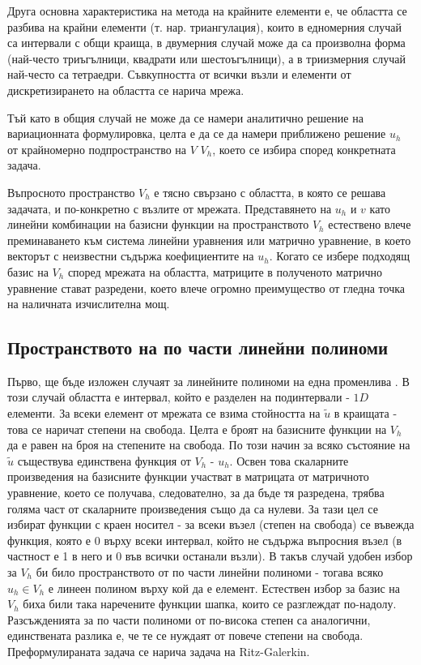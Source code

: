 \documentclass{report}
\begin{document}
	Друга основна характеристика на метода на крайните елементи е, че областта се разбива на крайни елементи (т. нар. триангулация), които в едномерния случай са интервали с общи краища, в двумерния случай може да са произволна форма (най-често триъгълници, квадрати или шестоъгълници), а в триизмерния случай най-често са тетраедри. Съвкупността от всички възли и елементи от дискретизирането на областта се нарича мрежа.
	
	Тъй като в общия случай не може да се намери аналитично решение на вариационната формулировка, целта е да се да намери приближено решение ${u_h}$ от крайномерно подпространство на $V$ $V_h$, което се избира според конкретната задача. 
	
	Въпросното пространство $V_h$ е тясно свързано с областта, в която се решава задачата, и по-конкретно с възлите от мрежата. Представянето на $u_h$ и $v$ като линейни комбинации на базисни функции на пространството $V_h$ естествено влече преминаването към система линейни уравнения или матрично уравнение, в което векторът с неизвестни съдържа коефициентите на $u_h$. Когато се избере подходящ базис на $V_h$ според мрежата на областта, матриците в полученото матрично уравнение стават разредени, което влече огромно преимущество от гледна точка на наличната изчислителна мощ.
	
	
	\subsection{Пространството на по части линейни полиноми}\label{subsec:223}
	
	Първо, ще бъде изложен случаят за линейните полиноми на една променлива \cite{larson2013finite}. В този случай областта е интервал, който е разделен на подинтервали - $1D$ елементи. За всеки елемент от мрежата се взима стойността на $\tilde{u}$ в краищата - това се наричат степени на свобода. Целта е броят на базисните функции на $V_h$ да е равен на броя на степените на свобода. По този начин за всяко състояние на $\tilde{u}$ съществува единствена функция от $V_h$ - $u_h$. Освен това скаларните произведения на базисните функции участват в матрицата от матричното уравнение, което се получава, следователно, за да бъде тя разредена, трябва голяма част от скаларните произведения също да са нулеви. За тази цел се избират функции с краен носител - за всеки възел (степен на свобода) се въвежда функция, която е $0$ върху всеки интервал, който не съдържа въпросния възел (в частност е 1 в него и 0 във всички останали възли). В такъв случай удобен избор за $V_h$ би било пространството от по части линейни полиноми - тогава всяко $u_h \in V_h$ е линеен полином върху кой да е елемент. Естествен избор за базис на $V_h$ биха били така наречените функции шапка, които се разглеждат по-надолу. Разсъжденията за по части полиноми от по-висока степен са аналогични, единствената разлика е, че те се нуждаят от повече степени на свобода. Преформулираната задача се нарича задача на Ritz-Galerkin.
	
\end{document}
